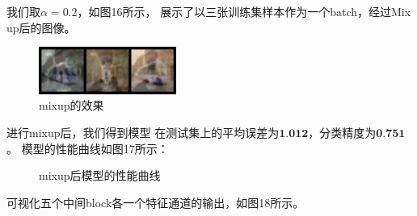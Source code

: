\documentclass[UTF8]{ctexart}
\begin{document}
我们取$\alpha=0.2$，如图16所示，
展示了以三张训练集样本作为一个batch，经过Mix up后的图像。

\begin{figure}[htbp]
    \centering
    \includegraphics[width=0.40\textwidth]{../img/sample_mixup.png}
    \caption{mixup的效果}
\end{figure}

进行mixup后，我们得到模型
在测试集上的平均误差为$\textbf{1.012}$，分类精度为$\textbf{0.751}$。
模型的性能曲线如图17所示：

\begin{figure}[htbp]
    \centering
    \hspace{0.5in}
    \caption{mixup后模型的性能曲线}
\end{figure}

可视化五个中间block各一个特征通道的输出，如图18所示。
\end{document}
